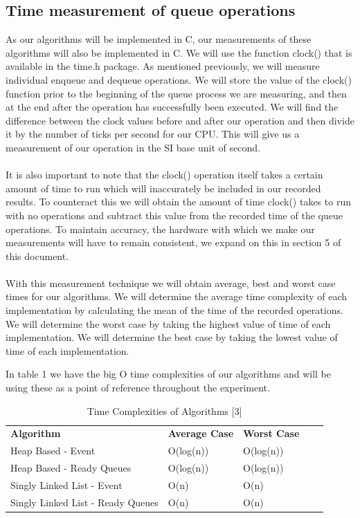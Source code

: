 \documentclass[12pt]{article}
\begin{document}
\subsection{Time measurement of queue operations}

As our algorithms will be implemented in C, our measurements of these algorithms will also be implemented in C. We will use the function clock() that is available in the time.h package. As mentioned previously, we will measure individual enqueue and dequeue operations. We will store the value of the clock() function prior to the beginning of the queue process we are measuring, and then at the end after the operation has successfully been executed. We will find the difference between the clock values before and after our operation and then divide it by the number of ticks per second for our CPU.  This will give us a measurement of our operation in the SI base unit of second.
\\
\\
It is also important to note that the clock() operation itself takes a certain amount of time to run which will inaccurately be included in our recorded results. To counteract this we will obtain the amount of time clock()  takes to run with no operations and subtract this value from the recorded time of the queue operations. To maintain accuracy, the hardware with which we make our measurements will have to remain consistent, we expand on this in section 5 of this document. 
\\
\\
With this measurement technique we will obtain average, best and worst case times for our algorithms. We will determine the average time complexity of each implementation by calculating the mean of the time of the recorded operations. We will determine the worst case by taking the highest value of time of each implementation. We will determine the best case by taking the lowest value of time of each implementation.

In table 1 we have the big O time complexities of our algorithms and will be using these as a point of reference throughout the experiment.    

\begin{table}[h]
\caption{ Time Complexities of Algorithms [3]}
\begin{tabular}{|l|l|l|ll}
\cline{1-3}
\textbf{Algorithm}                & \textbf{Average Case} & \textbf{Worst Case} &  &  \\ \cline{1-3}Heap Based - Event                & O(log(n))    & O(log(n))  &  &  \\ \cline{1-3}
Heap Based - Ready Queues         & O(log(n))    & O(log(n))  &  &  \\ \cline{1-3}
Singly Linked List - Event        & O(n)         & O(n)       &  &  \\ \cline{1-3}
Singly Linked List - Ready Queues & O(n)         & O(n)       &  &  \\ \cline{1-3}
\end{tabular}
\end{table}
\end{document}
